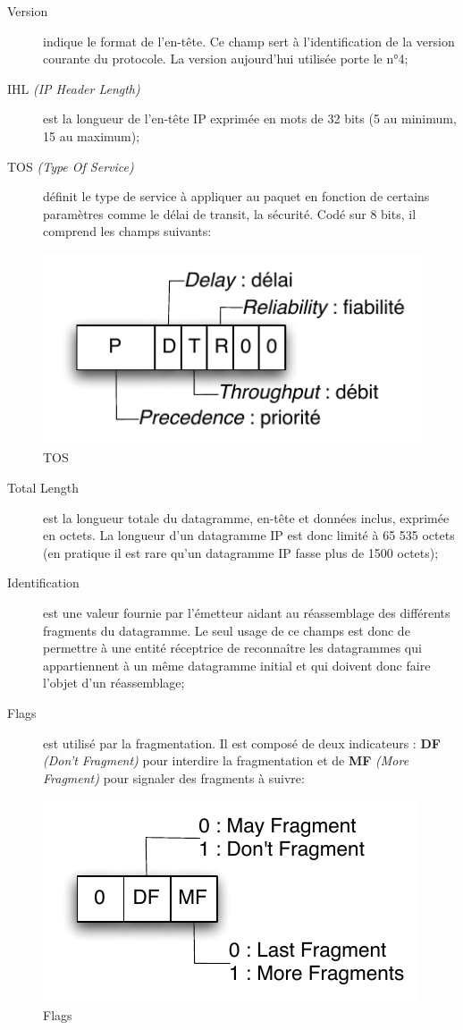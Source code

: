 \documentclass[11pt,english,french]{scrreprt}
\theoremstyle{remark}
\theoremstyle{definition}
\begin{document}
\begin{description}
	\item [Version] indique le format de l'en-tête. Ce champ sert à l'identification de la version courante du protocole. La version aujourd'hui utilisée porte le n°4;
	\item [IHL \emph{(IP Header Length)}] est la longueur de l'en-tête IP exprimée en mots de 32 bits (5 au minimum, 15 au maximum);
	\item [TOS \emph{(Type Of Service)}] définit le type de service à appliquer au paquet en fonction de certains paramètres comme le délai de transit, la sécurité. Codé sur 8 bits, il comprend les champs suivants:
\end {description}
	\begin{figure}[h!]
		\center
		\includegraphics[scale=.75]{graphes/IP/TOS}
		\caption{TOS}
	\end{figure}
\begin{description}
	\item [Total Length] est la longueur totale du datagramme, en-tête et données inclus, exprimée en octets. La longueur d'un datagramme IP est donc limité à 65 535 octets (en pratique il est rare qu'un datagramme IP fasse plus de 1500 octets);
	\item [Identification] est une valeur fournie par l'émetteur aidant au réassemblage des différents fragments du datagramme. Le seul usage de ce champs est donc de permettre à une entité réceptrice de reconnaître les datagrammes qui appartiennent à un même datagramme initial et qui doivent donc faire l'objet d'un réassemblage;
	\item [Flags] est utilisé par la fragmentation. Il est composé de deux indicateurs : \textbf{DF} \emph{(Don't Fragment)} pour interdire la fragmentation et de \textbf{MF} \emph{(More Fragment)} pour signaler des fragments à suivre:
\end {description}
	\begin{figure}[h!]
		\center
		\includegraphics[scale=.75]{graphes/IP/Flags}
		\caption{Flags}
	\end{figure}
\end{document}
